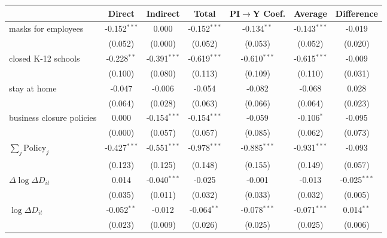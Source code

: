 
\begin{tabular}{lccccc|>{}c}
\toprule
  & Direct & Indirect & Total & PI$\to$Y Coef. & Average & Difference\\
\midrule
masks for employees & -0.152$^{***}$ & 0.000 & -0.152$^{***}$ & -0.134$^{**}$ & -0.143$^{***}$ & -0.019\\
 & (0.052) & (0.000) & (0.052) & (0.053) & (0.052) & (0.020)\\
closed K-12 schools & -0.228$^{**}$ & -0.391$^{***}$ & -0.619$^{***}$ & -0.610$^{***}$ & -0.615$^{***}$ & -0.009\\
 & (0.100) & (0.080) & (0.113) & (0.109) & (0.110) & (0.031)\\
stay at home & -0.047 & -0.006 & -0.054 & -0.082 & -0.068 & 0.028\\
 & (0.064) & (0.028) & (0.063) & (0.066) & (0.064) & (0.023)\\
business closure policies & 0.000 & -0.154$^{***}$ & -0.154$^{***}$ & -0.059 & -0.106$^{*}$ & -0.095\\
 & (0.000) & (0.057) & (0.057) & (0.085) & (0.062) & (0.073)\\
$\sum_j \mathrm{Policy}_j$ & -0.427$^{***}$ & -0.551$^{***}$ & -0.978$^{***}$ & -0.885$^{***}$ & -0.931$^{***}$ & -0.093\\
 & (0.123) & (0.125) & (0.148) & (0.155) & (0.149) & (0.057)\\
$\Delta \log \Delta D_{it}$ & 0.014 & -0.040$^{***}$ & -0.025 & -0.001 & -0.013 & -0.025$^{***}$\\
 & (0.035) & (0.011) & (0.032) & (0.033) & (0.032) & (0.005)\\
$\log \Delta D_{it}$ & -0.052$^{**}$ & -0.012 & -0.064$^{**}$ & -0.078$^{***}$ & -0.071$^{***}$ & 0.014$^{**}$\\
 & (0.023) & (0.009) & (0.026) & (0.025) & (0.025) & (0.006)\\
\bottomrule
\end{tabular}